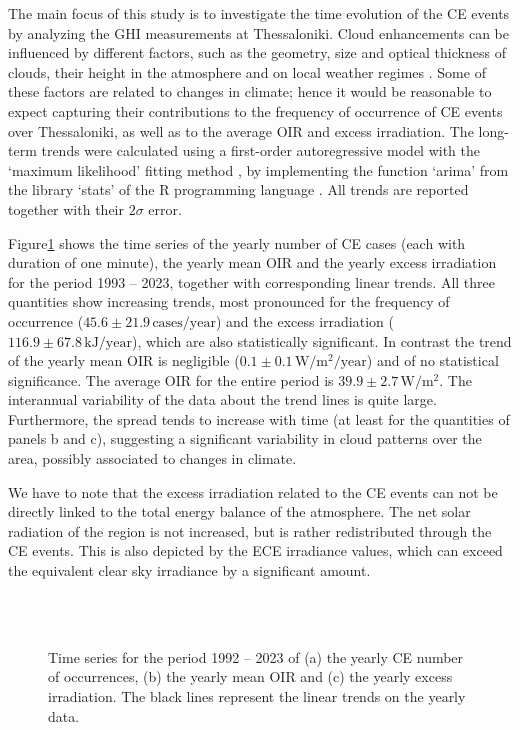 \documentclass[preprint, 5p,
authoryear]{elsarticle} %
\begin{document}
The main focus of this study is to investigate the time evolution of the
CE events by analyzing the GHI measurements at Thessaloniki. Cloud
enhancements can be influenced by different factors, such as the
geometry, size and optical thickness of clouds, their height in the
atmosphere and on local weather regimes
\citep{Mol2023, Veerman2022, Gristey2022, Tzoumanikas2016}. Some of
these factors are related to changes in climate; hence it would be
reasonable to expect capturing their contributions to the frequency of
occurrence of CE events over Thessaloniki, as well as to the average OIR
and excess irradiation. The long-term trends were calculated using a
first-order autoregressive model with the `maximum likelihood' fitting
method \citep{Gardner1980, Jones1980}, by implementing the function
`arima' from the library `stats' of the R programming language
\citep{RCT2023}. All trends are reported together with their \(2\sigma\)
error.

Figure\nobreakspace{}\ref{fig:P-energy} shows the time series of the
yearly number of CE cases (each with duration of one minute), the yearly
mean OIR and the yearly excess irradiation for the period 1993 -- 2023,
together with corresponding linear trends. All three quantities show
increasing trends, most pronounced for the frequency of occurrence
(\(45.6\pm 21.9\,\text{cases}/\text{year}\)) and the excess irradiation
(\(116.9 \pm 67.8\,\text{kJ}/\text{year}\)), which are also
statistically significant. In contrast the trend of the yearly mean OIR
is negligible (\(0.1\pm 0.1\,\text{W}/\text{m}^2/\text{year}\)) and of
no statistical significance. The average OIR for the entire period is
\(39.9\pm 2.7\,\text{W}/\text{m}^2\). The interannual variability of the
data about the trend lines is quite large. Furthermore, the spread tends
to increase with time (at least for the quantities of panels b and c),
suggesting a significant variability in cloud patterns over the area,
possibly associated to changes in climate.

We have to note that the excess irradiation related to the CE events can
not be directly linked to the total energy balance of the atmosphere.
The net solar radiation of the region is not increased, but is rather
redistributed through the CE events. This is also depicted by the ECE
irradiance values, which can exceed the equivalent clear sky irradiance
by a significant amount.

\begin{figure}%
        {\centering 
            \\
            \\
        }
    \caption{Time series for the period 1992 -- 2023 of (a) the yearly CE number of occurrences, (b) the yearly mean OIR and (c) the yearly excess irradiation. The black lines represent the linear trends on the yearly data.}\label{fig:P-energy}
\end{figure}
\end{document}
